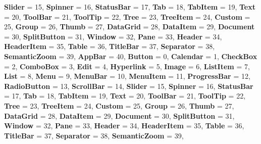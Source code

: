 \begin{DoxyCompactItemize}
{\bfseries Slider} = 15, 
{\bfseries Spinner} = 16, 
\newline
{\bfseries Status\+Bar} = 17, 
{\bfseries Tab} = 18, 
{\bfseries Tab\+Item} = 19, 
{\bfseries Text} = 20, 
\newline
{\bfseries Tool\+Bar} = 21, 
{\bfseries Tool\+Tip} = 22, 
{\bfseries Tree} = 23, 
{\bfseries Tree\+Item} = 24, 
\newline
{\bfseries Custom} = 25, 
{\bfseries Group} = 26, 
{\bfseries Thumb} = 27, 
{\bfseries Data\+Grid} = 28, 
\newline
{\bfseries Data\+Item} = 29, 
{\bfseries Document} = 30, 
{\bfseries Split\+Button} = 31, 
{\bfseries Window} = 32, 
\newline
{\bfseries Pane} = 33, 
{\bfseries Header} = 34, 
{\bfseries Header\+Item} = 35, 
{\bfseries Table} = 36, 
\newline
{\bfseries Title\+Bar} = 37, 
{\bfseries Separator} = 38, 
{\bfseries Semantic\+Zoom} = 39, 
{\bfseries App\+Bar} = 40, 
\newline
{\bfseries Button} = 0, 
{\bfseries Calendar} = 1, 
{\bfseries Check\+Box} = 2, 
{\bfseries Combo\+Box} = 3, 
\newline
{\bfseries Edit} = 4, 
{\bfseries Hyperlink} = 5, 
{\bfseries Image} = 6, 
{\bfseries List\+Item} = 7, 
\newline
{\bfseries List} = 8, 
{\bfseries Menu} = 9, 
{\bfseries Menu\+Bar} = 10, 
{\bfseries Menu\+Item} = 11, 
\newline
{\bfseries Progress\+Bar} = 12, 
{\bfseries Radio\+Button} = 13, 
{\bfseries Scroll\+Bar} = 14, 
{\bfseries Slider} = 15, 
\newline
{\bfseries Spinner} = 16, 
{\bfseries Status\+Bar} = 17, 
{\bfseries Tab} = 18, 
{\bfseries Tab\+Item} = 19, 
\newline
{\bfseries Text} = 20, 
{\bfseries Tool\+Bar} = 21, 
{\bfseries Tool\+Tip} = 22, 
{\bfseries Tree} = 23, 
\newline
{\bfseries Tree\+Item} = 24, 
{\bfseries Custom} = 25, 
{\bfseries Group} = 26, 
{\bfseries Thumb} = 27, 
\newline
{\bfseries Data\+Grid} = 28, 
{\bfseries Data\+Item} = 29, 
{\bfseries Document} = 30, 
{\bfseries Split\+Button} = 31, 
\newline
{\bfseries Window} = 32, 
{\bfseries Pane} = 33, 
{\bfseries Header} = 34, 
{\bfseries Header\+Item} = 35, 
\newline
{\bfseries Table} = 36, 
{\bfseries Title\+Bar} = 37, 
{\bfseries Separator} = 38, 
{\bfseries Semantic\+Zoom} = 39, 

\end{DoxyCompactItemize}

